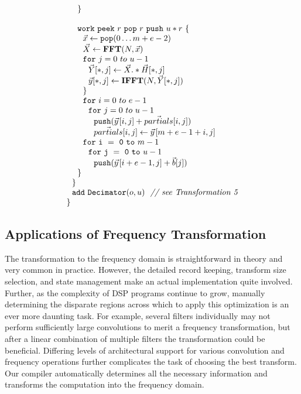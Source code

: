\begin{transformation}
\begin{equation}
{\begin{array}{ll}
    ~~~~{\tt \}} \\
    \\
    ~~~~{\tt work}~{\tt peek}~r~{\tt pop}~r~{\tt push}~u*r~{\tt \{} \\
    ~~~~~~\vec{x} \leftarrow {\tt pop}(0 \dots m+e-2) \\
    ~~~~~~\vec{X} \leftarrow \mathbf{FFT} (N, \vec{x}) \\
    ~~~~~~{\tt for}~j=0~to~u-1\\
    ~~~~~~~~\vec{Y}[*,j] \leftarrow \vec{X} .* \vec{H}[*,j] \\
    ~~~~~~~~\vec{y}[*,j] \leftarrow \mathbf{IFFT}(N, \vec{Y}[*,j]) \\
    ~~~~~~{\tt \}} \\
    ~~~~~~{\tt for}~i=0~to~e-1\\
    ~~~~~~~~{\tt for}~j=0~to~u-1\\
    ~~~~~~~~~~{\tt push}(\vec{y}\hspace{1pt}[i,j] + \vec{partials}[i,j])\\
    ~~~~~~~~~~\vec{partials}[i,j] \leftarrow \vec{y}\hspace{1pt}[m+e-1+i,j]\\
    ~~~~~~{\tt for~i~=~0~to~}m-1\\
    ~~~~~~~~{\tt for~j~=~0~to~}u-1\\
    ~~~~~~~~~~{\tt push}(\vec{y}\hspace{1pt}[i+e-1,j] + {\vec b}[j])\\
    ~~~~{\tt \}} \\
    ~~{\tt \}} \\
    ~~{\tt add~Decimator}(o, u)~~\mbox{\it // see Transformation 5}\\
    {\tt \}} \\
  \end{array}}
\end{equation}
\label{trans:freq1}
\end{transformation}

\subsection{Applications of Frequency Transformation}

The transformation to the frequency domain is straightforward in
theory and very common in practice. However, the detailed record
keeping, transform size selection, and state management make an actual
implementation quite involved.  Further, as the complexity of DSP
programs continue to grow, manually determining the disparate regions
across which to apply this optimization is an ever more daunting task.
For example, several filters individually may not perform sufficiently
large convolutions to merit a frequency transformation, but after a
linear combination of multiple filters the transformation could be
beneficial.  Differing levels of architectural support for various
convolution and frequency operations further complicates the task of
choosing the best transform.  Our compiler automatically determines
all the necessary information and transforms the computation into the
frequency domain.

